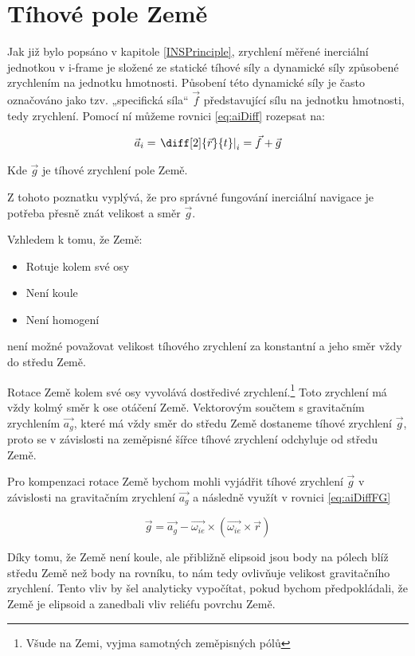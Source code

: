\section{Tíhové pole Země}
Jak již bylo popsáno v kapitole \ref{INSPrinciple}, zrychlení měřené inerciální jednotkou v i-frame je složené ze statické tíhové síly a dynamické síly způsobené zrychlením na jednotku hmotnosti. Působení této dynamické síly je často označováno jako tzv. „specifická síla“ $ \vec{f} $ představující sílu na jednotku hmotnosti, tedy zrychlení. Pomocí ní můžeme rovnici \ref{eq:aiDiff} rozepsat na: \cite{Tittertonc2004} \cite{Grewal2013}

\begin{equation} \label{eq:aiDiffFG}
\vec{a}_{i} = \left. \diff[2]{\vec{r}}{t} \right|_{i} = \vec{f} + \vec{g}
\end{equation}

Kde $ \vec{g} $ je tíhové zrychlení pole Země.

Z tohoto poznatku vyplývá, že pro správné fungování inerciální navigace je potřeba přesně znát velikost a směr $ \vec{g} $. 

Vzhledem k tomu, že Země: \cite{Halliday2000}
\begin{itemize}
\item Rotuje kolem své osy
\item Není koule
\item Není homogení
\end{itemize}
není možné považovat velikost tíhového zrychlení za konstantní a jeho směr vždy do středu Země.

Rotace Země kolem své osy vyvolává dostředivé zrychlení.\footnote{Všude na Zemi, vyjma samotných zeměpisných pólů}
Toto zrychlení má vždy kolmý směr k ose otáčení Země. Vektorovým součtem s gravitačním zrychlením $ \vec{a_{g}} $, které má vždy směr do středu Země dostaneme tíhové zrychlení $ \vec{g} $, proto se v závislosti na zeměpisné šířce tíhové zrychlení odchyluje od středu Země. \cite{Halliday2000}

Pro kompenzaci rotace Země bychom mohli vyjádřit tíhové zrychlení $ \vec{g} $ v závislosti na gravitačním zrychlení $ \vec{a_{g}} $ a následně využít v rovnici \ref{eq:aiDiffFG} \cite{Tittertonc2004}

\begin{equation} \label{eq:coriolis}
\vec{g}=\vec{a_{g}} - \vec{\omega_{ie}} \times (\vec{\omega_{ie}} \times \vec{r})
\end{equation}

Díky tomu, že Země není koule, ale přibližně elipsoid jsou body na pólech blíž středu Země než body na rovníku, to nám tedy ovlivňuje velikost gravitačního zrychlení. Tento vliv by šel analyticky vypočítat, pokud bychom předpokládali, že Země je elipsoid a zanedbali vliv reliéfu povrchu Země. \cite{Halliday2000}

